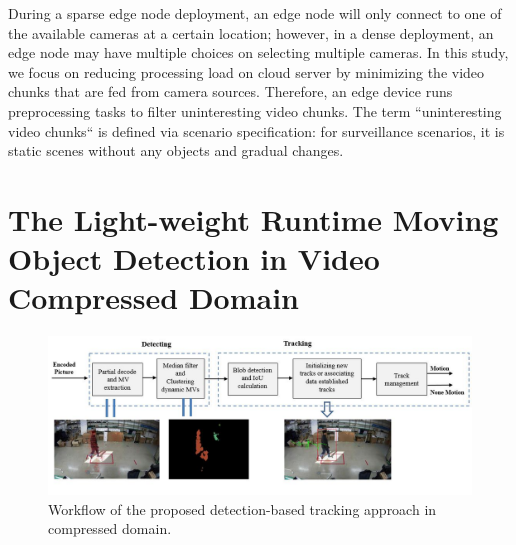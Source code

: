 During a sparse edge node deployment, an edge node will only connect to one of the available cameras at a certain location; however, in a dense deployment, an edge node may have multiple choices on selecting multiple cameras. In this study, we focus on reducing processing load on cloud server by minimizing the video chunks that are fed from camera sources. Therefore, an edge device runs preprocessing tasks to filter uninteresting video chunks. The term “uninteresting video chunks“ is defined via scenario specification: for surveillance scenarios, it is static scenes without any objects and gradual changes.

\section{The Light-weight Runtime Moving Object Detection in Video Compressed Domain}
\begin{figure}
\centering
 \includegraphics[width=1.0\linewidth]{Figures/arch.jpg}
 \caption{Workflow of the proposed detection-based tracking approach in compressed domain.}
 \label{fig:proposedMethod}
\end{figure}
